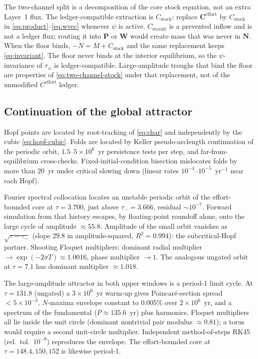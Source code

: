 \documentclass[11pt]{article}
\theoremstyle{definition}
\begin{document}
The two-channel split is a decomposition of the core stock equation, not an extra Layer~1 flux. The ledger-compatible extraction is $C_{\mathrm{stock}}$: replace $\mathbf C^{\mathrm{effort}}$ by $C_{\mathrm{stock}}$ in \eqref{eq:product}--\eqref{eq:wvec} whenever $\psi$ is active. $C_{\mathrm{recruit}}$ is a prevented inflow and is not a ledger flux; routing it into $\mathbf P$ or $\mathbf W$ would create mass that was never in $\mathbf N$. When the floor binds, $-\dot N=M+C_{\mathrm{stock}}$ and the same replacement keeps \eqref{eq:invariant}. The floor never binds at the interior equilibrium, so the $\psi$-invariance of $\tau_\pm$ is ledger-compatible. Large-amplitude troughs that bind the floor are properties of \eqref{eq:two-channel-stock} under that replacement, not of the unmodified $C^{\mathrm{effort}}$ ledger.

\subsection{Continuation of the global attractor}
\label{sec:numerical-continuation}

Hopf points are located by root-tracking of \eqref{eq:char} and independently by the cubic \eqref{eq:hopf-cubic}. Folds are located by Keller pseudo-arclength continuation of the periodic orbit, $1.5$--$5\times 10^6$~yr persistence tests per step, and far-from-equilibrium cross-checks. Fixed-initial-condition bisection mislocates folds by more than $20$~yr under critical slowing down (linear rates $10^{-4}$--$10^{-5}$~yr$^{-1}$ near each Hopf).

Fourier spectral collocation \cite{engelborghs2002} locates an unstable periodic orbit of the effort-bounded core at $\tau=3.700$, just above $\tau_-=3.666$, residual $\sim 10^{-7}$. Forward simulation from that history escapes, by floating-point roundoff alone, onto the large cycle of amplitude $\approx 55.8$. Amplitude of the small orbit vanishes as $\sqrt{\tau-\tau_-}$ (slope $29.8$ in amplitude-squared, $R^2=0.994$): the subcritical-Hopf partner. Shooting Floquet multipliers: dominant radial multiplier $\to\exp(-2\sigma T)\approx 1.0016$, phase multiplier $\to 1$. The analogous ungated orbit at $\tau=7.1$ has dominant multiplier $\approx 1.018$.

The large-amplitude attractor in both upper windows is a period-1 limit cycle. At $\tau=131.8$ (ungated) a $3\times 10^6$~yr warm-up gives Poincar\'e-section spread $<5\times 10^{-3}$, $N$-maxima envelope constant to $0.005\%$ over $2\times 10^6$~yr, and a spectrum of the fundamental ($P\approx 135.6$~yr) plus harmonics. Floquet multipliers all lie inside the unit circle (dominant nontrivial pair modulus $\approx 0.81$); a torus would require a second unit-circle multiplier. Independent method-of-steps RK45 (rel.\ tol.\ $10^{-9}$) reproduces the envelope. The effort-bounded core at $\tau=148.4,150,152$ is likewise period-1.
\end{document}
